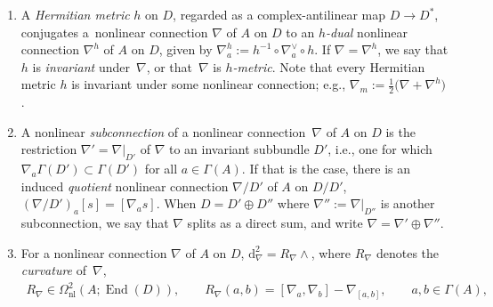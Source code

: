 \documentclass[pdftex]{sigma}
\numberwithin{equation}{section}
\newcommand{\la}{\langle}
\newcommand{\ra}{\rangle}
\newcommand{\dd}{\mathrm{d}}
\newcommand{\8}{\infty}
\begin{document}
\begin{enumerate}
\begin{itemize}
\begin{gather*}
 \!\sum_{i=0}^p\! (-1)^i\nabla_{a_i}\eta(a_0,\dots ,\widehat{a_i},\dots ,a_p) + \!\sum_{i<j}\! (-1)^{i+j}\eta([a_i,a_j],a_0,\dots ,\widehat{a_i},\dots ,\widehat{a_j},\dots ,a_p);\!
\end{gather*}
\item a \emph{dual} nonlinear connection $\nabla^{\vee}$ of $A$ on $D^*$, defined by the condition that
\begin{gather*}
 \mathscr{L}_a\la \theta,s\ra = \la \nabla^{\vee}_a\theta,s\ra + \la \theta,\nabla_as\ra, \qquad a \in \Gamma(A), \qquad s \in \Gamma(D), \quad \theta \in \Gamma(D^*),
\end{gather*}
\item a nonlinear connection of $A$ on $\operatorname{End}(D)$, given by $\nabla_aT=[\nabla_a,T]$, whose induced derivation $\dd_{\nabla}\colon\Omega_{\mathrm{nl}}(A;\operatorname{End}(D)) \to \Omega_{\mathrm{nl}}(A;\operatorname{End}(D))$ is given by the graded commuta\-tor~$[\nabla,\cdot]$.
\end{itemize}
\item A \emph{Hermitian metric} $h$ on $D$, regarded as a complex-antilinear map $D \to D^*$, conjugates a~nonlinear connection $\nabla$ of $A$ on $D$ to an \emph{$h$-dual} nonlinear connection $\nabla^h$ of $A$ on $D$, given by $\nabla^h_a:= h^{-1} \circ \nabla^{\vee}_a \circ h$. If $\nabla=\nabla^h$, we say that $h$ is \emph{invariant} under~$\nabla$, or that~$\nabla$ is \emph{$h$-metric}. Note that every Hermitian metric $h$ is invariant under some nonlinear connection; e.g., $\nabla_m:= \frac{1}{2}\big(\nabla+\nabla^h\big)$.
\item A nonlinear \emph{subconnection} of a nonlinear connection~$\nabla$ of $A$ on $D$ is the restriction $\nabla'=\nabla|_{D'}$ of $\nabla$ to an invariant subbundle $D'$, i.e., one for which $\nabla_a \Gamma(D') \subset \Gamma(D')$ for all $a \in \Gamma(A)$. If that is the case, there is an induced \emph{quotient} nonlinear connection $\nabla/D'$ of $A$ on $D/D'$, $(\nabla/D')_a [s] = [\nabla_as]$. When $D = D' \oplus D''$ where $\nabla'':=\nabla|_{D''}$ is another subconnection, we say that $\nabla$ splits as a direct sum, and write $\nabla = \nabla' \oplus \nabla''$.
\item For a nonlinear connection $\nabla$ of $A$ on $D$, $\dd_{\nabla}^2=R_{\nabla} \wedge $, where $R_{\nabla}$ denotes the \emph{curvature} of~$\nabla$,
\begin{gather*}
 R_{\nabla} \in \Omega^2_{\mathrm{nl}}(A;\operatorname{End}(D)), \qquad R_{\nabla}(a,b) = [\nabla_a,\nabla_b]-\nabla_{[a,b]}, \qquad a,b \in \Gamma(A),

\end{gather*}
\end{enumerate}
\end{document}
